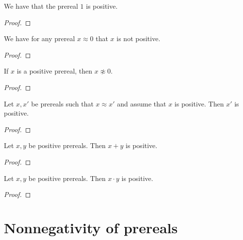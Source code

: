 \begin{lemma}
    \leanok
    We have that the prereal $1$ is positive.
\end{lemma}
\begin{proof}
    \leanok
\end{proof}

\begin{lemma}
    \leanok
    We have for any prereal $x \approx 0$ that $x$ is not positive.
\end{lemma}
\begin{proof}
    \leanok
\end{proof}

\begin{lemma}
    \leanok
    If $x$ is a positive prereal, then $x \not\approx 0$.
\end{lemma}
\begin{proof}
    \leanok
\end{proof}

\begin{lemma}
    \leanok
    Let $x,x'$ be prereals such that $x \approx x'$ and assume that $x$ is positive.
    Then $x'$ is positive.
\end{lemma}
\begin{proof}
    \leanok
\end{proof}

\begin{lemma}
    \leanok
    Let $x,y$ be positive prereals.
    Then $x + y$ is positive.
\end{lemma}
\begin{proof}
    \leanok
\end{proof}

\begin{lemma}
    \leanok
    Let $x,y$ be positive prereals.
    Then $x \cdot y$ is positive.
\end{lemma}
\begin{proof}
    \leanok
\end{proof}

\section{Nonnegativity of prereals}


